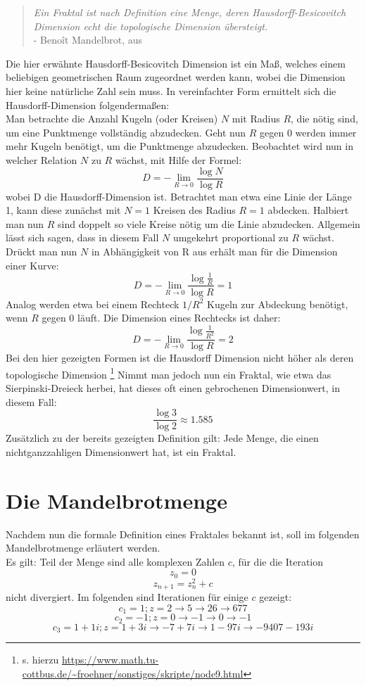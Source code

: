 \documentclass[a4paper,12pt,onesided]{report}
\begin{document}
\begin{quotation}
	\textit{Ein Fraktal ist nach Definition eine Menge, deren  Hausdorff-Besicovitch Dimension echt die topologische Dimension übersteigt.}
	\\ - Benoît Mandelbrot, aus \cite[S. 27]{mandelbrot2013fraktale}
\end{quotation}
Die hier erwähnte Hausdorff-Besicovitch Dimension ist ein Maß, welches einem beliebigen geometrischen Raum zugeordnet werden kann, wobei die Dimension hier keine natürliche Zahl sein muss. In vereinfachter Form ermittelt sich die Hausdorff-Dimension folgendermaßen:\\
Man betrachte die Anzahl Kugeln (oder Kreisen) $N$ mit Radius $R$, die nötig sind, um eine Punktmenge vollständig abzudecken.
Geht nun $R$ gegen 0 werden immer mehr Kugeln benötigt, um die Punktmenge abzudecken. Beobachtet wird nun in welcher Relation $N$ zu $R$ wächst, mit Hilfe der Formel:
\[D = - \lim_{R \to 0} \frac{\log{N}}{\log{R}}\]
wobei D die Hausdorff-Dimension ist. Betrachtet man etwa eine Linie der Länge 1, kann diese zunächst mit $N = 1$ Kreisen des Radius $R = 1$ abdecken. Halbiert man nun $R$ sind doppelt so viele Kreise nötig um die Linie abzudecken. Allgemein lässt sich sagen, dass in diesem Fall $N$ umgekehrt proportional zu $R$ wächst. Drückt man nun $N$ in Abhängigkeit von R aus erhält man für die Dimension einer Kurve:
\[D = - \lim_{R \to 0} \frac{\log{\frac{1}{R}}}{\log{R}} = 1\]
Analog werden etwa bei einem Rechteck $1/R^2$ Kugeln zur Abdeckung benötigt, wenn $R$ gegen 0 läuft. Die Dimension eines Rechtecks ist daher:
\[D = - \lim_{R \to 0} \frac{\log{\frac{1}{R^2}}}{\log{R}} = 2\]
Bei den hier gezeigten Formen ist die Hausdorff Dimension nicht höher als deren topologische Dimension \footnote{s. hierzu \url{https://www.math.tu-cottbus.de/~froehner/sonstiges/skripte/node9.html}} 
Nimmt man jedoch nun ein Fraktal, wie etwa das Sierpinski-Dreieck %
herbei, hat dieses oft einen gebrochenen Dimensionwert, in diesem Fall:
\[\frac{\log{3}}{\log{2}}\approx 1.585\]
Zusätzlich zu der bereits gezeigten Definition gilt:
Jede Menge, die einen nichtganzzahligen Dimensionwert hat, ist ein Fraktal\cite[S. 27]{mandelbrot2013fraktale}.

\section{Die Mandelbrotmenge}
Nachdem nun die formale Definition eines Fraktales bekannt ist, soll im folgenden Mandelbrotmenge erläutert werden.\\
Es gilt: Teil der Menge sind alle komplexen Zahlen $c$, für die die Iteration
\[z_0=0\]
\[z_{n+1}=z_n^2 + c\]
nicht divergiert.
Im folgenden sind Iterationen für einige $c$ gezeigt:
\[c_1=1 ; z=2 \rightarrow 5 \rightarrow 26 \rightarrow 677\]
\[c_2=-1 ; z=0 \rightarrow -1 \rightarrow 0 \rightarrow -1\]
\[c_3=1+1i ; z=1+3i \rightarrow -7+7i \rightarrow 1-97i \rightarrow -9407-193i\]
\end{document}
